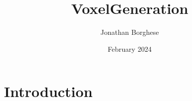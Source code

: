 \documentclass{article}
\title{VoxelGeneration}
\author{Jonathan Borghese}
\date{February 2024}
\begin{document}
\maketitle

\section{Introduction}
\end{document}
